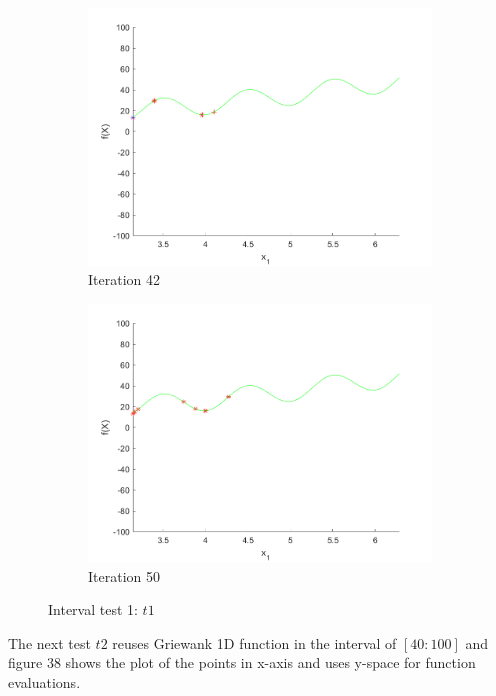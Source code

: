 \begin{figure}
\begin{subfigure}[b]{0.4\textwidth}
   \includegraphics[width=\textwidth]{img/smpl/rast1dshft/loa-iter-42}
   \caption{Iteration 42}
   \label{fig:s3-iter-6}
 \end{subfigure}
 \begin{subfigure}[b]{0.4\textwidth}
   \includegraphics[width=\textwidth]{img/smpl/rast1dshft/loa-iter-50}
   \caption{Iteration 50}
   \label{fig:s3-iter-7}
 \end{subfigure}
 \caption{Interval test 1: $t1$}
\end{figure}

\par The next test $t2$ reuses Griewank 1D function in the interval of $[40:100]$ and figure 38 shows the plot of the points in x-axis and uses y-space for function evaluations.

